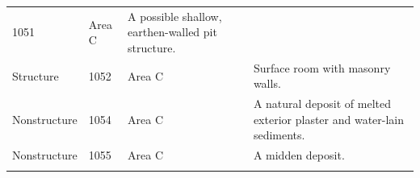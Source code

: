 \documentclass[
  12pt,
]{krantz}
\begin{document}
\begin{longtable}[]{@{}llll@{}}
\begin{minipage}[t]{0.11\columnwidth}
1051\strut
\end{minipage} & \begin{minipage}[t]{0.16\columnwidth}\raggedright
Area C\strut
\end{minipage} & \begin{minipage}[t]{0.38\columnwidth}\raggedright
A possible shallow,
earthen-walled pit
structure.\strut
\end{minipage}\tabularnewline
\begin{minipage}[t]{0.18\columnwidth}\raggedright
Structure\strut
\end{minipage} & \begin{minipage}[t]{0.11\columnwidth}\raggedright
1052\strut
\end{minipage} & \begin{minipage}[t]{0.16\columnwidth}\raggedright
Area C\strut
\end{minipage} & \begin{minipage}[t]{0.38\columnwidth}\raggedright
Surface room with masonry
walls.\strut
\end{minipage}\tabularnewline
\begin{minipage}[t]{0.18\columnwidth}\raggedright
Nonstructure\strut
\end{minipage} & \begin{minipage}[t]{0.11\columnwidth}\raggedright
1054\strut
\end{minipage} & \begin{minipage}[t]{0.16\columnwidth}\raggedright
Area C\strut
\end{minipage} & \begin{minipage}[t]{0.38\columnwidth}\raggedright
A natural deposit of melted
exterior plaster and
water-lain sediments.\strut
\end{minipage}\tabularnewline
\begin{minipage}[t]{0.18\columnwidth}\raggedright
Nonstructure\strut
\end{minipage} & \begin{minipage}[t]{0.11\columnwidth}\raggedright
1055\strut
\end{minipage} & \begin{minipage}[t]{0.16\columnwidth}\raggedright
Area C\strut
\end{minipage} & \begin{minipage}[t]{0.38\columnwidth}\raggedright
A midden deposit.\strut
\end{minipage}\tabularnewline
\begin{minipage}[t]{0.18\columnwidth}\raggedright

\end{minipage}
\end{longtable}
\end{document}
